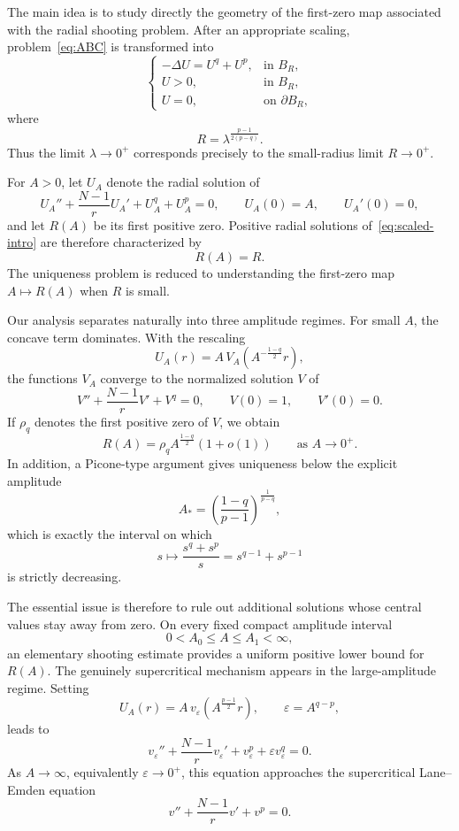 \documentclass[11pt]{article}
\theoremstyle{definition}
\begin{document}
The main idea is to study directly the geometry of the first-zero map
associated with the radial shooting problem. After an appropriate
scaling, problem~\eqref{eq:ABC} is transformed into
\begin{equation}
\label{eq:scaled-intro}
\begin{cases}
-\Delta U=U^q+U^p,
&\text{in }B_R,\\
U>0,
&\text{in }B_R,\\
U=0,
&\text{on }\partial B_R,
\end{cases}
\end{equation}
where
\begin{equation}
\label{eq:Rlambda-intro}
R=\lambda^{\frac{p-1}{2(p-q)}}.
\end{equation}
Thus the limit $\lambda\to0^+$ corresponds precisely to the
small-radius limit $R\to0^+$.

For $A>0$, let $U_A$ denote the radial solution of
\begin{equation}
\label{eq:shooting-intro}
U_A''
+\frac{N-1}{r}U_A'
+U_A^q+U_A^p=0,
\qquad
U_A(0)=A,
\qquad
U_A'(0)=0,
\end{equation}
and let $R(A)$ be its first positive zero. Positive radial solutions
of~\eqref{eq:scaled-intro} are therefore characterized by
\[
R(A)=R.
\]
The uniqueness problem is reduced to understanding the first-zero map
$A\mapsto R(A)$ when $R$ is small.

Our analysis separates naturally into three amplitude regimes. For
small $A$, the concave term dominates. With the rescaling
\[
U_A(r)
=
A\,V_A\!\left(A^{-\frac{1-q}{2}}r\right),
\]
the functions $V_A$ converge to the normalized solution $V$ of
\begin{equation}
\label{eq:pure-concave-intro}
V''
+\frac{N-1}{r}V'
+V^q=0,
\qquad
V(0)=1,
\qquad
V'(0)=0.
\end{equation}
If $\rho_q$ denotes the first positive zero of $V$, we obtain
\begin{equation}
\label{eq:R-small-intro}
R(A)
=
\rho_q A^{\frac{1-q}{2}}(1+o(1))
\qquad\text{as }A\to0^+.
\end{equation}
In addition, a Picone-type argument gives uniqueness below the
explicit amplitude
\begin{equation}
\label{eq:Astar-intro}
A_*=
\left(
\frac{1-q}{p-1}
\right)^{\frac1{p-q}},
\end{equation}
which is exactly the interval on which
\[
s\longmapsto
\frac{s^q+s^p}{s}
=
s^{q-1}+s^{p-1}
\]
is strictly decreasing.

The essential issue is therefore to rule out additional solutions
whose central values stay away from zero. On every fixed compact
amplitude interval
\[
0<A_0\leq A\leq A_1<\infty,
\]
an elementary shooting estimate provides a uniform positive lower
bound for $R(A)$. The genuinely supercritical mechanism appears in
the large-amplitude regime. Setting
\[
U_A(r)
=
A\,v_\varepsilon
\left(A^{\frac{p-1}{2}}r\right),
\qquad
\varepsilon=A^{q-p},
\]
leads to
\[
v_\varepsilon''
+\frac{N-1}{r}v_\varepsilon'
+v_\varepsilon^p
+\varepsilon v_\varepsilon^q
=0.
\]
As $A\to\infty$, equivalently $\varepsilon\to0^+$, this equation
approaches the supercritical Lane--Emden equation
\[
v''
+\frac{N-1}{r}v'
+v^p=0.
\]
\end{document}
